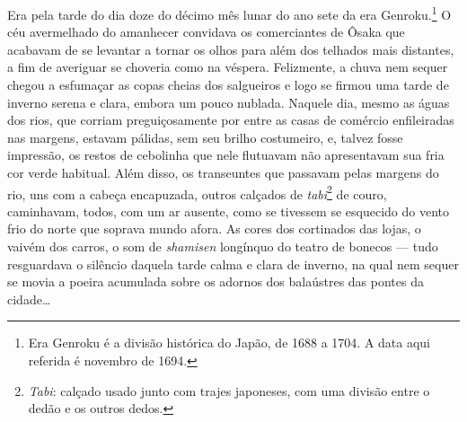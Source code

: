 \noindent{}Era pela tarde do dia doze do décimo mês lunar do ano sete da era
Genroku.\footnote{ Era Genroku é a divisão histórica do Japão, de 1688 a 1704. 
A data aqui referida é novembro de 1694.} O céu avermelhado do amanhecer
convidava os comerciantes de Ôsaka que acabavam de se levantar a tornar
os olhos para além dos telhados mais distantes, a fim de averiguar se
choveria como na véspera. Felizmente, a chuva nem sequer chegou a
esfumaçar as copas cheias dos salgueiros e logo se firmou uma tarde de
inverno serena e clara, embora um pouco nublada. Naquele dia, mesmo as
águas dos rios, que corriam preguiçosamente por entre as casas de
comércio enfileiradas nas margens, estavam pálidas, sem seu brilho
costumeiro, e, talvez fosse impressão, os restos de cebolinha que nele
flutuavam não apresentavam sua fria cor verde habitual. Além disso, os
transeuntes que passavam pelas margens do rio, uns com a cabeça
encapuzada, outros calçados de \textit{tabi}\footnote{ \textit{Tabi}:
calçado usado junto com trajes japoneses, com uma divisão entre o dedão
e os outros dedos.} de couro, caminhavam, todos, com um ar ausente,
como se tivessem se esquecido do vento frio do norte que soprava mundo
afora. As cores dos cortinados das lojas, o vaivém dos carros, o som de
\textit{shamisen} longínquo do teatro de bonecos --- tudo resguardava o
silêncio daquela tarde calma e clara de inverno, na qual nem sequer se
movia a poeira acumulada sobre os adornos dos balaústres das pontes da cidade\ldots{}

